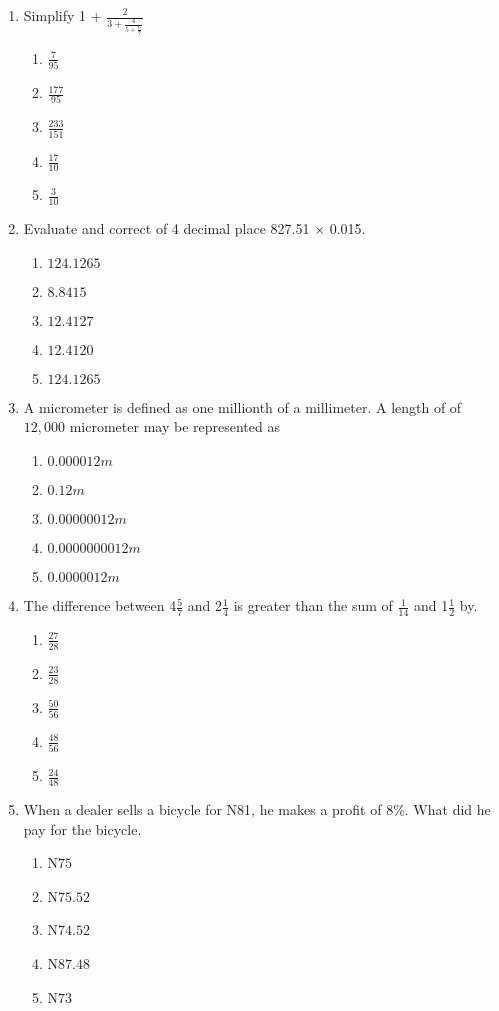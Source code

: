\begin{multicols}{2}
\begin{enumerate}[label={\arabic*.}]
\begin{enumerate}[label={\Alph*.}]
    \end{enumerate}
\item Simplify 1 + \(\frac{2}{3 + \frac{4}{5+ \frac{6}{7}}}\)
    \begin{enumerate}[label={\Alph*.}]
    \item \(\frac{7}{95}\)
    \item \(\frac{177}{95}\)
    \item \(\frac{233}{151}\)
    \item \(\frac{17}{10}\)
    \item \(\frac{3}{10}\)

    \end{enumerate}
\item Evaluate and correct of 4 decimal place 827.51 \(\times\) 0.015.
    \begin{enumerate}[label={\Alph*.}]
    \item \(124.1265\)
    \item \(8.8415\)
    \item \(12.4127\)
    \item \(12.4120\)
    \item \(124.1265\)

    \end{enumerate}
\item A micrometer is defined as one millionth of a millimeter. A length of of \(12,000\) micrometer may be represented as
    \begin{enumerate}[label={\Alph*.}]
    \item \(0.000012m\)
    \item \(0.12m\)
    \item \(0.00000012m\)
    \item \(0.0000000012m\)
    \item \(0.0000012m\)

    \end{enumerate}
\item The difference between 4\(\frac{5}{7}\) and 2\(\frac{1}{4}\) is greater than the sum of \(\frac{1}{14}\) and 1\(\frac{1}{2}\) by.
    \begin{enumerate}[label={\Alph*.}]
    \item \(\frac{27}{28}\)
    \item \(\frac{23}{28}\)
    \item \(\frac{50}{56}\)
    \item \(\frac{48}{56}\)
    \item \(\frac{24}{48}\)

    \end{enumerate}
\item When a dealer sells a bicycle for N81, he makes a profit of 8\%. What did he pay for the bicycle. 
    \begin{enumerate}[label={\Alph*.}]
    \item N\(75\)
    \item N\(75.52\)
    \item N\(74.52\)
    \item N\(87.48\)
    \item N\(73\)


\end{enumerate}
\end{enumerate}
\end{multicols}
